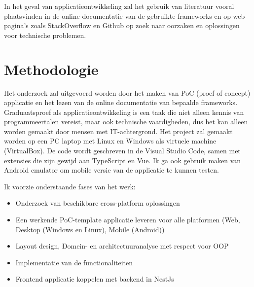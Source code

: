 In het geval van applicatieontwikkeling zal het gebruik van literatuur vooral plaatsvinden in de online documentatie van de gebruikte frameworks en op web-pagina's zoals StackOverflow en Github op zoek naar oorzaken en oplossingen voor technische problemen.



\section{Methodologie}%
\label{sec:methodologie}

Het onderzoek zal uitgevoerd worden door het maken van PoC (proef of concept) applicatie en het lezen van de online documentatie van bepaalde frameworks.
Graduaatsproef als applicatieontwikkeling is een taak die niet alleen kennis van programmeertalen vereist, maar ook technische vaardigheden, dus het kan alleen worden gemaakt door mensen met IT-achtergrond.
Het project zal gemaakt worden op een PC laptop met Linux en Windows als virtuele machine (VirtualBox). De code wordt geschreven in de Visual Studio Code, samen met extensies die zijn gewijd aan TypeScript en Vue. Ik ga ook gebruik maken van Android emulator om mobile versie van de applicatie te kunnen testen.


Ik voorzie onderstaande fases van het werk:
\begin{itemize}
  \item Onderzoek van beschikbare cross-platform oplossingen
  \item Een werkende PoC-template applicatie leveren voor alle platformen (Web, Desktop (Windows en Linux), Mobile (Android))
  \item Layout design, Domein- en architectuuranalyse met respect voor OOP
  \item Implementatie van de functionaliteiten
  \item Frontend applicatie koppelen met backend in NestJs
\end{itemize}

